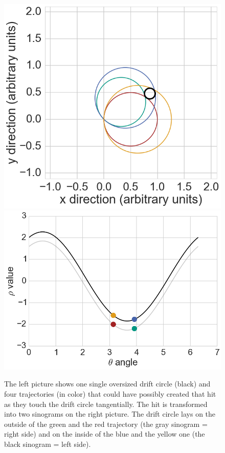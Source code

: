 \begin{figure}
  \centering
  \includegraphics[scale=0.27]{figures/theory/sinosodial_1.png}
  \hspace*{1cm}
  \includegraphics[scale=0.27]{figures/theory/sinosodial_2.png}
  \caption[Sinograms in the Legendre algorithm.]{The left picture shows one single oversized drift circle (black) and four trajectories (in color) that could have possibly created that hit as they touch the drift circle tangentially. The hit is transformed into two sinograms on the right picture. The drift circle lays on the outside of the green and the red trajectory (the gray sinogram = right side) and on the inside of the blue and the yellow one (the black sinogram = left side).}
  \label{fig-sinusodial}
\end{figure}


